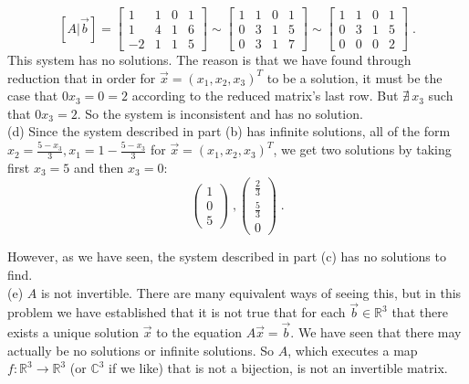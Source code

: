 \documentclass[11pt]{article}
\begin{document}
$$
[A|\vec{b}] = \begin{bmatrix}
1 & 1 & 0 & 1 \\ 1 & 4 & 1 & 6 \\ -2 & 1 & 1 & 5
\end{bmatrix}
\sim \begin{bmatrix}
1 & 1 & 0 & 1 \\ 0 & 3 & 1 & 5 \\ 0 & 3 & 1 & 7
\end{bmatrix}
\sim \begin{bmatrix}
1 & 1 & 0 & 1 \\ 0 & 3 & 1 & 5 \\ 0&0&0&2
\end{bmatrix} \;.
$$
This system has no solutions. The reason is that we have found through reduction that in order for $\vec{x} = (x_1,x_2,x_3)^T$ to be a solution,  it must be the case that $0x_3 = 0 = 2$ according to the reduced matrix's last row. But $\nexists \, x_3$ such that $0x_3 = 2$. So the system is inconsistent and has no solution. \\

(d) Since the system described in part (b) has infinite solutions, all of the form $x_2 = \frac{5-x_3}{3}, x_1 = 1 - \frac{5-x_3}{3}$ for $\vec{x} = (x_1, x_2, x_3)^T$,
we get two solutions by taking first $x_3 = 5$ and then $x_3 = 0$:
$$ \begin{pmatrix}
1 \\ 0 \\ 5
\end{pmatrix} \;,
\begin{pmatrix}
\frac{2}{3} \\[2pt] \frac{5}{3} \\[2pt] 0
\end{pmatrix} \;.$$

However, as we have seen, the system described in part (c) has no solutions to find.\\

(e) $A$ is not invertible. There are many equivalent ways of seeing this, but in this problem we have established that it is not true that for each $\vec{b} \in \mathbb{R}^3$ that there exists a unique solution $\vec{x}$ to the equation $A\vec{x} = \vec{b}$. We have seen that there may actually be no solutions or infinite solutions. So $A$, which executes a map $f : \mathbb{R}^3 \longrightarrow \mathbb{R}^3$ (or $\mathbb{C}^3$ if we like) that is not a bijection, is not an invertible matrix.\\
\end{document}
